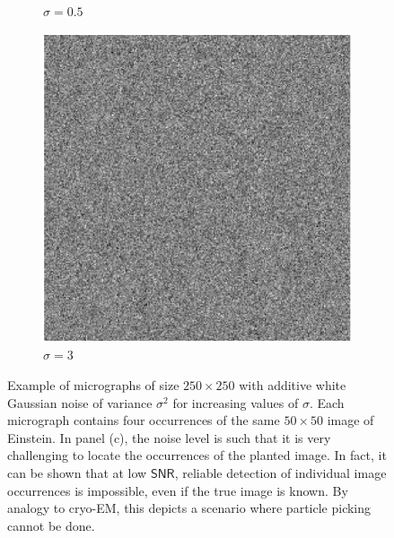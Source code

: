 \documentclass[english,11pt]{article}
\newcommand{\1}{\mathbf{1}}
\numberwithin{equation}{section}
\theoremstyle{plain}
\theoremstyle{definition}
\theoremstyle{remark}
\theoremstyle{plain}
\theoremstyle{remark}
\theoremstyle{plain}
\theoremstyle{plain}
\newcommand{\SNR}{\ensuremath{\textsf{SNR}}}
\begin{document}
\begin{figure}[h!]
\begin{subfigure}[h]{0.33\textwidth}
		\caption{$\sigma = 0.5$}
	\end{subfigure}
	\begin{subfigure}[h]{0.33\textwidth}
		\centering
		\includegraphics[scale=0.5]{micrograph_Einstein_example_s3}
		\caption{$\sigma = 3$}
	\end{subfigure}
	\caption{\label{fig:micro_example} Example of micrographs of size $250\times 250$ with additive white Gaussian noise of variance $\sigma^2$ for increasing values of $\sigma$. Each micrograph contains four occurrences of the same $50 \times 50$ image of Einstein. In panel (c), the noise level is such that it is very challenging to locate the occurrences of the planted image. In fact, it can be shown that at low $\SNR$, reliable detection of individual image occurrences is impossible, even if the true image is known. By analogy to cryo-EM, this depicts a scenario where particle picking cannot be done.}	
\end{figure}
\end{document}
